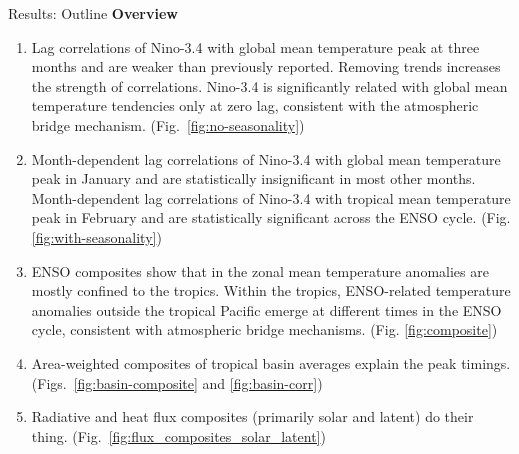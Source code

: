 \documentclass[aspectratio=169,xcolor=dvipsnames]{beamer}
\begin{document}
\begin{frame}{Results: Outline}
  \small \textbf{Overview}
  \begin{enumerate}
  \item Lag correlations of Nino-3.4 with global mean temperature peak
    at three months and are weaker than previously reported. Removing
    trends increases the strength of correlations. Nino-3.4 is
    significantly related with global mean temperature tendencies only
    at zero lag, consistent with the atmospheric bridge mechanism.
    (Fig.\ \ref{fig:no-seasonality})
  \item Month-dependent lag correlations of Nino-3.4 with global mean
    temperature peak in January and are statistically insignificant in
    most other months.  Month-dependent lag correlations of Nino-3.4
    with tropical mean temperature peak in February and are
    statistically significant across the ENSO cycle.
    (Fig. \ref{fig:with-seasonality})
  \item ENSO composites show that in the zonal mean temperature
    anomalies are mostly confined to the tropics. Within the tropics,
    ENSO-related temperature anomalies outside the tropical Pacific
    emerge at different times in the ENSO cycle, consistent with
    atmospheric bridge mechanisms. (Fig. \ref{fig:composite})
  \item Area-weighted composites of tropical basin averages explain
    the peak timings. (Figs.\ \ref{fig:basin-composite} and
    \ref{fig:basin-corr})
  \item Radiative and heat flux composites (primarily solar and
    latent) do their thing. (Fig.\
    \ref{fig:flux_composites_solar_latent})
  \end{enumerate}
\end{frame}
\end{document}
